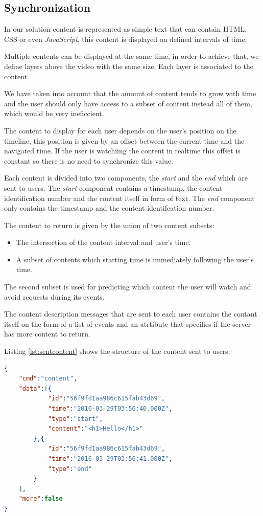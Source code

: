 	\subsection{Synchronization}

	In our solution content is represented as simple text that can contain \ac{HTML}, \ac{CSS} or even \emph{JavaScript}, this content is displayed on defined intervals of time.

	Multiple contents can be displayed at the same time, in order to achieve that, we define layers above the video with the same size. Each layer is associated to the content.

	We have taken into account that the amount of content tends to grow with time and the user should only have access to a subset of content instead all of them, which would be very ineficcient.

	The content to display for each user depends on the user's position on the timeline, this position is given by an offset between the current time and the navigated time. If the user is watchiing the content in realtime this offset is constant so there is no need to synchronize this value.

	Each content is divided into two components, the \emph{start} and the \emph{end} which are sent to users. The \emph{start} component contains a timestamp, the content identification number and the content itself in form of text. The \emph{end} component only contains the timestamp and the content identifcation number. 

	The content to return is given by the union of two content subsets:
	\begin{itemize}
		\item The intersection of the content interval and user's time.
		\item A subset of contents which starting time is immediately following the user's time.
	\end{itemize}

	The second subset is used for predicting which content the user will watch and avoid requests during its events.

	The content description messages that are sent to each user contains the contant itself on the form of a list of events and an atrtibute that specifies if the server has more content to return.

	Listing \ref{lst:sentcontent} shows the structure of the content sent to users.

\begin{minipage}{\linewidth}
\begin{lstlisting}[caption={Exampe of content sent to users},label={lst:sentcontent},language=json]
{
	"cmd":"content",
	"data":[{
			"id":"56f9fd1aa986c615fab43d69",
			"time":"2016-03-29T03:56:40.000Z",
			"type":"start",
			"content":"<h1>Hello</h1>"
		},{
			"id":"56f9fd1aa986c615fab43d69",
			"time":"2016-03-29T03:56:41.000Z",
			"type":"end"
		}
	],
	"more":false
}
\end{lstlisting}
\end{minipage}


